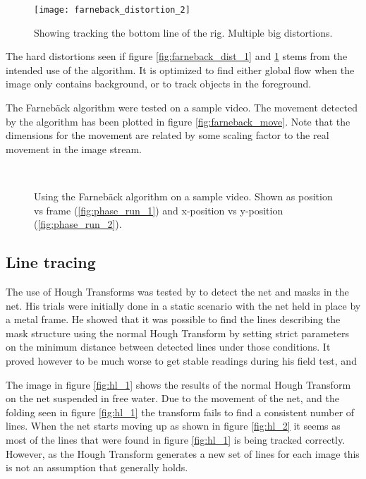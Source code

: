 \begin{figure}[htbp]
	\centering
	\texttt{[image: farneback\_distortion\_2]}
	\caption{Showing \citet{farnebackSCIA03} tracking the bottom line of the rig. Multiple big distortions.}
	\label{fig:farneback_dist_2}
\end{figure}

The hard distortions seen if figure \ref{fig:farneback_dist_1} and 
\ref{fig:farneback_dist_2} stems from the intended use 
of the algorithm. It is optimized to find either global flow when 
the image only contains background, or to track objects in the foreground. 

The Farnebäck algorithm were tested on a sample video. The movement detected by
the algorithm has been plotted in figure \vref{fig:farneback_move}. Note that 
the dimensions for the movement are related by 
some scaling factor to the real movement in the image stream.

\begin{figure}[htbp]
    \centering
    \\
	\caption{Using the Farnebäck algorithm on a sample video. 
		Shown as position vs frame (\ref{fig:phase_run_1}) and x-position vs y-position (\ref{fig:phase_run_2}).}
	\label{fig:farneback_move}
\end{figure}

\clearpage

\subsection{Line tracing}
The use of Hough Transforms was tested by \citet{carlsen10} to detect the net and masks in the net. His trials were initially done in a 
static scenario with the net held in place by a metal frame. He showed that it was possible to find the lines describing the mask 
structure using the normal Hough Transform by setting strict parameters on the minimum distance between detected lines under those conditions.
It proved however to be much worse to get stable readings during his field test, and 

The image in figure \vref{fig:hl_1} shows the results of the normal Hough Transform on the net suspended in free water. Due to the 
movement of the net, and the folding seen in figure \ref{fig:hl_1} the transform fails to find a consistent number of lines. When  
the net starts moving up as shown in figure \ref{fig:hl_2} it seems as most of the lines that were found in figure \ref{fig:hl_1} 
is being tracked correctly. However, as the Hough Transform generates a new set of lines for each image this is not an assumption 
that generally holds. 

